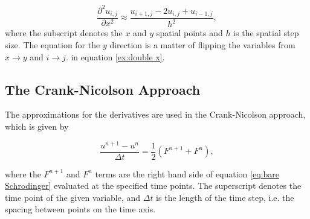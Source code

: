 \documentclass[english,notitlepage,reprint,nofootinbib]{revtex4-2}  %
\begin{document}
	\begin{equation}\label{ex:double x}
		\frac{\partial^2 u_{i,j}}{\partial x^2} \approx \frac{u_{i+1,j}-2u_{i,j}+u_{i-1,j}}{h^2},
	\end{equation}
	where the subscript denotes the $x$ and $y$ spatial points and $h$ is the spatial step size.
	The equation for the $y$ direction is a matter of flipping the variables from
	$x \rightarrow y$ and $i \rightarrow j$.
	in equation \ref{ex:double x}.
	\subsection{The Crank-Nicolson Approach}
	
	\noindent
	The approximations for the derivatives are used in
	the Crank-Nicolson approach, which is given by
	
	\begin{equation}
		\frac{u^{n+1}-u^{n}}{\Delta t} = \frac{1}{2}    \left(     F^{n+1} + F^n     \right),
	\end{equation}

	\noindent
	where the $F^{n+1}$ and $F^n$ terms are the right hand side of equation \ref{eq:bare Schrodinger}
	evaluated at the specified time points. The superscript denotes the time point of the given variable, and $\Delta t$ is the length of the time step,
	i.e. the spacing between points on the time axis.\\
\end{document}
